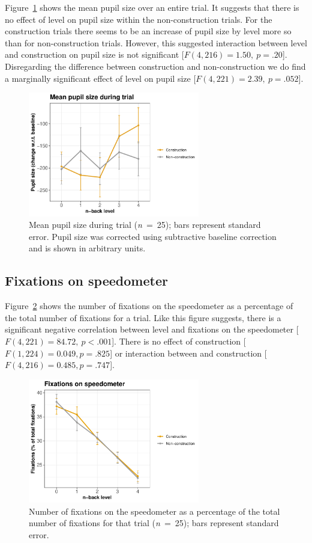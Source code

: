 Figure~\ref{fig:mean-ps} shows the mean pupil size over an entire trial. 
It suggests that there is no effect of \nback level on pupil size within the non-construction trials.
For the construction trials there seems to be an increase of pupil size by \nback level more so than for non-construction trials.
However, this suggested interaction between \nback level and construction on pupil size is not significant [\(F(4,216)=1.50,\ p=.20\)].
Disregarding the difference between construction and non-construction we do find a marginally significant effect of \nback level on pupil size [\(F(4,221)=2.39,\ p=.052\)].

\begin{figure}
  \centering
  \includegraphics[width=7.5cm]{images/pupil_size_interaction.pdf}
  \caption{Mean pupil size during trial (\textit{n}\ =\ 25); bars represent standard error.
  Pupil size was corrected using subtractive baseline correction and is shown in arbitrary units.}
  \label{fig:mean-ps}
\end{figure}

\subsection{Fixations on speedometer}
Figure~\ref{fig:fix-speedometer} shows the number of fixations on the speedometer as a percentage of the total number of fixations for a trial.
Like this figure suggests, there is a significant negative correlation between \nback level and fixations on the speedometer [\(F(4,221)=84.72,\ p<.001\)].
There is no effect of construction [\(F(1,224)=0.049, p=.825\)] or interaction between \nback and construction [\(F(4,216)=0.485, p=.747\)]. 

\begin{figure}
  \centering
  \includegraphics[width=7.5cm]{images/speedometer_interaction.pdf}
  \caption{Number of fixations on the speedometer as a percentage of the total number of fixations for that trial (\textit{n}\ =\ 25); bars represent standard error.}
  \label{fig:fix-speedometer}
\end{figure}
